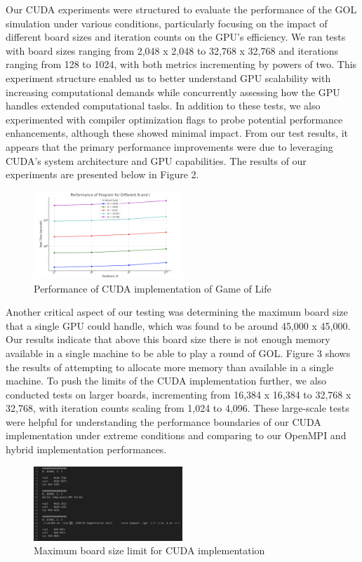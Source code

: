 \documentclass[11pt,twocolumn]{article}
\begin{document}
Our CUDA experiments were structured to evaluate the performance of the GOL simulation under various conditions, particularly focusing on the impact of different board sizes and iteration counts on the GPU's efficiency. We ran tests with board sizes ranging from 2,048 x 2,048 to 32,768 x 32,768 and iterations ranging from 128 to 1024, with both metrics incrementing by powers of two. This experiment structure enabled us to better understand GPU scalability with increasing computational demands while concurrently assessing how the GPU handles extended computational tasks. In addition to these tests, we also experimented with compiler optimization flags to probe potential performance enhancements, although these showed minimal impact. From our test results, it appears that the primary performance improvements were due to leveraging CUDA's system architecture and GPU capabilities. The results of our experiments are presented below in Figure 2.

\begin{figure}[!htbp]
    \centering
    \includegraphics[width=0.5\textwidth]{cuda.png}
    \caption{Performance of CUDA implementation of Game of Life}
    \label{fig:cuda}
\end{figure}

Another critical aspect of our testing was determining the maximum board size that a single GPU could handle, which was found to be around 45,000 x 45,000. Our results indicate that above this board size there is not enough memory available in a single machine to be able to play a round of GOL. Figure 3 shows the results of attempting to allocate more memory than available in a single machine. To push the limits of the CUDA implementation further, we also conducted tests on larger boards, incrementing from 16,384 x 16,384 to 32,768 x 32,768, with iteration counts scaling from 1,024 to 4,096. These large-scale tests were helpful for understanding the performance boundaries of our CUDA implementation under extreme conditions and comparing to our OpenMPI and hybrid implementation performances.

\begin{figure}[!htbp]
    \centering
    \includegraphics[width=0.5\textwidth]{CUDAExp3.png}
    \caption{Maximum board size limit for CUDA implementation}
    \label{fig:CUDAExp3}
\end{figure}
\end{document}
